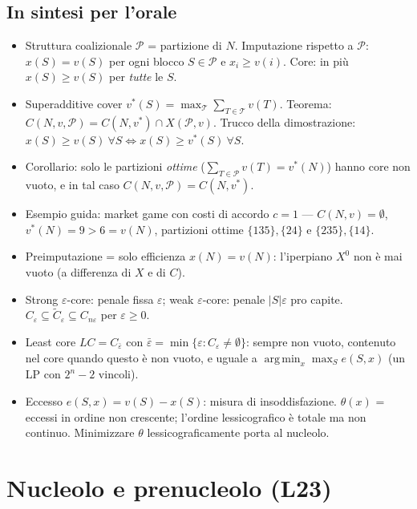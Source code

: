 \documentclass[12pt,a4paper,twoside]{book}
\theoremstyle{plain}
\theoremstyle{definition}
\newcommand{\argmin}{\operatorname*{arg\,min}}
\begin{document}
\section*{In sintesi per l'orale}
\begin{itemize}
  \item Struttura coalizionale $\mathcal{P}$ = partizione di $N$. Imputazione
        rispetto a $\mathcal{P}$: $x(S)=v(S)$ per ogni blocco $S\in\mathcal{P}$ e
        $x_i\ge v(i)$. Core: in più $x(S)\ge v(S)$ per \emph{tutte} le $S$.
  \item Superadditive cover $v^{*}(S)=\max_{\mathcal{T}}\sum_{T\in\mathcal{T}}v(T)$.
        Teorema: $C(N,v,\mathcal{P})=C(N,v^{*})\cap X(\mathcal{P},v)$. Trucco della
        dimostrazione: $x(S)\ge v(S)\ \forall S\iff x(S)\ge v^{*}(S)\ \forall S$.
  \item Corollario: solo le partizioni \emph{ottime} ($\sum_{T\in\mathcal{P}}v(T)=v^{*}(N)$)
        hanno core non vuoto, e in tal caso $C(N,v,\mathcal{P})=C(N,v^{*})$.
  \item Esempio guida: market game con costi di accordo $c=1$ --- $C(N,v)=\emptyset$,
        $v^{*}(N)=9>6=v(N)$, partizioni ottime $\{135\},\{24\}$ e $\{235\},\{14\}$.
  \item Preimputazione = solo efficienza $x(N)=v(N)$: l'iperpiano $X^{0}$ non è
        mai vuoto (a differenza di $X$ e di $C$).
  \item Strong $\varepsilon$-core: penale fissa $\varepsilon$; weak $\varepsilon$-core:
        penale $|S|\varepsilon$ pro capite. $C_\varepsilon\subseteq\widetilde C_\varepsilon\subseteq C_{n\varepsilon}$ per $\varepsilon\ge0$.
  \item Least core $LC=C_{\bar\varepsilon}$ con $\bar\varepsilon=\min\{\varepsilon: C_\varepsilon\ne\emptyset\}$:
        sempre non vuoto, contenuto nel core quando questo è non vuoto, e uguale a
        $\argmin_x\max_{S}e(S,x)$ (un LP con $2^n-2$ vincoli).
  \item Eccesso $e(S,x)=v(S)-x(S)$: misura di insoddisfazione. $\theta(x)$ =
        eccessi in ordine non crescente; l'ordine lessicografico è totale ma non
        continuo. Minimizzare $\theta$ lessicograficamente porta al nucleolo.
\end{itemize}

\chapter{Nucleolo e prenucleolo (L23)}
\label{ch:nucleolo}
\end{document}
